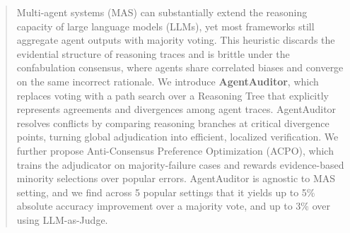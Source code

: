 \documentclass{article}
\theoremstyle{plain}
\theoremstyle{definition}
\theoremstyle{remark}
\begin{document}

\begin{abstract}
Multi-agent systems (MAS) can substantially extend the reasoning capacity of large language models (LLMs), yet most frameworks still aggregate agent outputs with majority voting. This heuristic discards the evidential structure of reasoning traces and is brittle under the confabulation consensus, where agents share correlated biases and converge on the same incorrect rationale. 
We introduce \textbf{AgentAuditor}, which replaces voting with a path search over a Reasoning Tree that explicitly represents agreements and divergences among agent traces. 
AgentAuditor resolves conflicts by comparing reasoning branches at critical divergence points, turning global adjudication into efficient, localized verification. 
We further propose Anti-Consensus Preference Optimization (ACPO), which trains the adjudicator on majority-failure cases and rewards evidence-based minority selections over popular errors. 
AgentAuditor is agnostic to MAS setting, and we find across 5 popular settings that it yields up to 5\% absolute accuracy improvement over a majority vote, and up to 3\% over using LLM-as-Judge.
\end{abstract}
\end{document}
